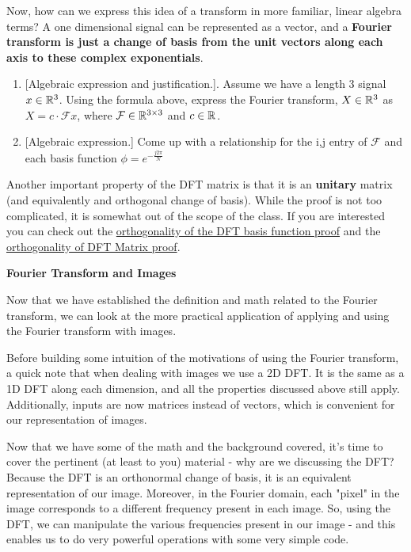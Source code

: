Now, how can we express this idea of a transform in more familiar, linear algebra terms? A one dimensional signal can be represented as a vector, and a \textbf{Fourier transform is just a change of basis from the unit vectors along each axis to these complex exponentials}.

\begin{enumerate}
\item 
{[Algebraic expression and justification.}].
Assume we have a length 3 signal $x\in\mathbb{R}^{3}$. 
Using the formula above, express the Fourier transform, $X\in\mathbb{R}^{3}$ as $X=c\cdot\mathcal{F} x$, where $\mathcal{F}\in\mathbb{R}^{3\times3}$ and $c\in\mathbb{R}^{}$.
\newline
\sol{}
\newline
\item {[Algebraic expression.]} Come up with a relationship for the i,j entry of $\mathcal{F}$ and each basis function $\phi=e^{-\frac{j2\pi}{N}}$
\newline
\sol{}
\end{enumerate}

Another important property of the DFT matrix is that it is an \textbf{unitary} matrix (and equivalently and orthogonal change of basis). While the proof is not too complicated, it is somewhat out of the scope of the class. If you are interested you can check out the \href{https://www.dsprelated.com/freebooks/mdft/Orthogonality_DFT_Sinusoids.html}{orthogonality of the DFT basis function proof} and the \href{https://www.dsprelated.com/freebooks/mdft/Matrix_Formulation_DFT.html}{orthogonality of DFT Matrix proof}.

\textbf{Fourier Transform and Images}

Now that we have established the definition and math related to the Fourier transform, we can look at the more practical application of applying and using the Fourier transform with images.

Before building some intuition of the motivations of using the Fourier transform, a quick note that when dealing with images we use a 2D DFT. It is the same as a 1D DFT along each dimension, and all the properties discussed above still apply. Additionally, inputs are now matrices instead of vectors, which is convenient for our representation of images.

Now that we have some of the math and the background covered, it's time to cover the pertinent (at least to you) material - why are we discussing the DFT? Because the DFT is an orthonormal change of basis, it is an equivalent representation of our image. Moreover, in the Fourier domain, each "pixel" in the image corresponds to a different frequency present in each image. So, using the DFT, we can manipulate the various frequencies present in our image - and this enables us to do very powerful operations with some very simple code.

